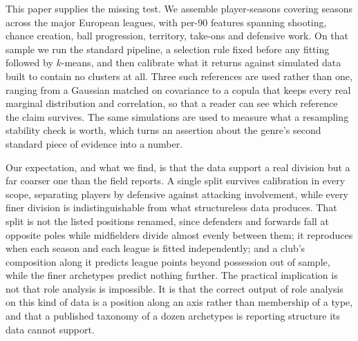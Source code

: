 This paper supplies the missing test. We assemble \ArcRows{} player-seasons covering
\ArcNSeasonsWord{} seasons across the \ArcNLeaguesWord{} major European leagues, with \ArcFeatures{}
per-90 features spanning shooting, chance creation, ball progression, territory, take-ons and
defensive work. On that sample we run the standard pipeline, a selection rule fixed before any
fitting followed by $k$-means, and then calibrate what it returns against simulated data built
to contain no clusters at all. Three such references are used rather than one, ranging from a
Gaussian matched on covariance to a copula that keeps every real marginal distribution and
correlation, so that a reader can see which reference the claim survives. The same simulations
are used to measure what a resampling stability check is worth, which turns an assertion about
the genre's second standard piece of evidence into a number.

Our expectation, and what we find, is that the data support a real division but a far coarser
one than the field reports. A single split survives calibration in every scope, separating
players by defensive against attacking involvement, while every finer division is
indistinguishable from what structureless data produces. That split is not the listed
positions renamed, since defenders and forwards fall at opposite poles while midfielders
divide almost evenly between them; it reproduces when each season and each league is fitted
independently; and a club's composition along it predicts league points beyond possession out
of sample, while the finer archetypes predict nothing further. The practical implication is
not that role analysis is impossible. It is that the correct output of role analysis on this
kind of data is a position along an axis rather than membership of a type, and that a
published taxonomy of a dozen archetypes is reporting structure its data cannot support.
